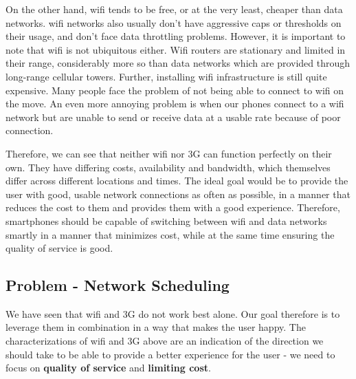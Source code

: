 \documentclass[12pt, fleqn]{article}
\begin{document}
On the other hand, wifi tends to be free, or at the very least, cheaper than 
data networks. wifi networks also usually don't have aggressive caps or thresholds 
on their usage, and don't face data throttling problems. However, it is important to 
note that wifi is not ubiquitous either. Wifi routers are stationary and limited 
in their range, considerably more so than data networks which are provided 
through long-range cellular towers. Further, installing wifi infrastructure is still
quite expensive.\cite[p. 105]{raman-2007} Many people face the problem of not being 
able to connect to wifi on the move. An even more annoying problem is when our 
phones connect to a wifi network but are unable to send or receive data at a 
usable rate because of poor connection.

Therefore, we can see that neither wifi nor 3G can function perfectly on their 
own. They have differing costs, availability and bandwidth, which themselves 
differ across different locations and times. The ideal goal would be to provide 
the user with good, usable network connections as often as possible, in a 
manner that reduces the cost to them and provides them with a good experience.
Therefore, smartphones should be capable of switching 
between wifi and data networks smartly in a manner that minimizes cost, while at 
the same time ensuring the quality of service is good.



\subsection{Problem - Network Scheduling}

We have seen that wifi and 3G do not work best alone. Our goal therefore is to 
leverage them in combination in a way that makes the user happy. The characterizations 
of wifi and 3G above are an indication of the direction we should take to be able to 
provide a better experience for the user - we need to focus on \textbf{quality of service} 
and \textbf{limiting cost}. 
\end{document}

